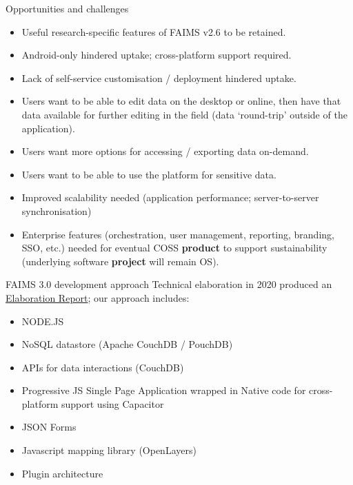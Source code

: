 \begin{frame}{Opportunities and challenges}
    \begin{itemize}
        \item Useful research-specific features of FAIMS v2.6 to be retained.
        \item Android-only hindered uptake; cross-platform support required.
        \item Lack of self-service customisation / deployment hindered uptake.
        \item Users want to be able to edit data on the desktop or online, then have that data available for further editing in the field (data `round-trip' outside of the application).
        \item Users want more options for accessing / exporting data on-demand.
        \item Users want to be able to use the platform for sensitive data. 
        \item Improved scalability needed (application performance; server-to-server synchronisation)
        \item Enterprise features (orchestration, user management, reporting, branding, SSO, etc.) needed for eventual COSS \textbf{product} to support sustainability (underlying software \textbf{project} will remain OS).
    \end{itemize}
\end{frame}

\begin{frame}{FAIMS 3.0 development approach}
Technical elaboration in 2020 produced an \href{https://zenodo.org/record/4616766}{Elaboration Report}; our approach includes:
    \begin{itemize}
        \item NODE.JS
        \item NoSQL datastore (Apache CouchDB / PouchDB)
        \item APIs for data interactions (CouchDB)
        \item Progressive JS Single Page Application wrapped in Native code
for cross-platform support using Capacitor
        \item JSON Forms
        \item Javascript mapping library (OpenLayers)
        \item Plugin architecture

    \end{itemize}
\end{frame}


